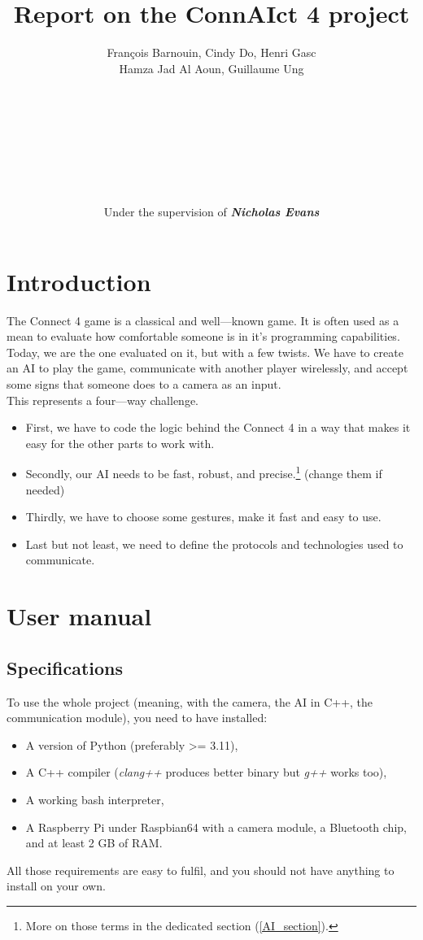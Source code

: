 \documentclass[11pt, a4paper, oneside]{report}
\title{\textbf{Report on the ConnAIct 4 project}}
\author{\normalsize François Barnouin, Cindy Do, Henri Gasc\\\normalsize Hamza Jad Al Aoun, Guillaume Ung\\\\\\\\\\\\\\\\\\Under the supervision of \textbf{\textit{Nicholas Evans}}}
\date{}
\begin{document}
	\marginsize{2.5cm}{2.5cm}{3cm}{3cm}
	\maketitle
	\tableofcontents

	\chapter{Introduction}
	The Connect 4 game is a classical and well—known game. It is often used as a mean to evaluate how comfortable someone is in it's programming capabilities. \\
	Today, we are the one evaluated on it, but with a few twists. We have to create an AI to play the game, communicate with another player wirelessly, and accept some signs that someone does to a camera as an input. \\
	This represents a four—way challenge.
	\begin{itemize}
		\item First, we have to code the logic behind the Connect 4 in a way that makes it easy for the other parts to work with.
		\item Secondly, our AI needs to be fast, robust, and precise.\footnote{More on those terms in the dedicated section (\ref{AI_section}).} (change them if needed)
		\item Thirdly, we have to choose some gestures, make it fast and easy to use.
		\item Last but not least, we need to define the protocols and technologies used to communicate.
	\end{itemize}

	\chapter{User manual}

	\section{Specifications}
	To use the whole project (meaning, with the camera, the AI in C++, the communication module), you need to have installed:
	\begin{itemize}
		\item A version of Python (preferably >= 3.11),
		\item A C++ compiler (\textit{clang++} produces better binary but \textit{g++} works too),
		\item A working bash interpreter,
		\item A Raspberry Pi under Raspbian64 with a camera module, a Bluetooth chip, and at least 2 GB of RAM.\@
	\end{itemize}
	All those requirements are easy to fulfil, and you should not have anything to install on your own. \\
\end{document}
